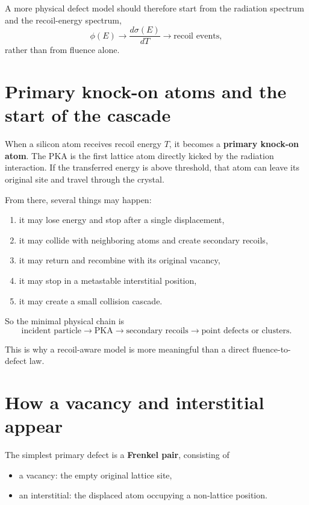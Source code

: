 \documentclass[11pt]{article}
\begin{document}
A more physical defect model should therefore start from the radiation spectrum and the recoil-energy spectrum,
\begin{equation}
\phi(E) \rightarrow \frac{d\sigma(E)}{dT} \rightarrow \text{recoil events},
\end{equation}
rather than from fluence alone.

\section{Primary knock-on atoms and the start of the cascade}

When a silicon atom receives recoil energy $T$, it becomes a \textbf{primary knock-on atom}. The PKA is the first lattice atom directly kicked by the radiation interaction. If the transferred energy is above threshold, that atom can leave its original site and travel through the crystal.

From there, several things may happen:
\begin{enumerate}[label=\arabic*.]
    \item it may lose energy and stop after a single displacement,
    \item it may collide with neighboring atoms and create secondary recoils,
    \item it may return and recombine with its original vacancy,
    \item it may stop in a metastable interstitial position,
    \item it may create a small collision cascade.
\end{enumerate}

So the minimal physical chain is
\begin{equation}
\text{incident particle} \rightarrow \text{PKA} \rightarrow \text{secondary recoils} \rightarrow \text{point defects or clusters}.
\end{equation}

This is why a recoil-aware model is more meaningful than a direct fluence-to-defect law.

\section{How a vacancy and interstitial appear}

The simplest primary defect is a \textbf{Frenkel pair}, consisting of
\begin{itemize}
    \item a vacancy: the empty original lattice site,
    \item an interstitial: the displaced atom occupying a non-lattice position.
\end{itemize}
\end{document}
